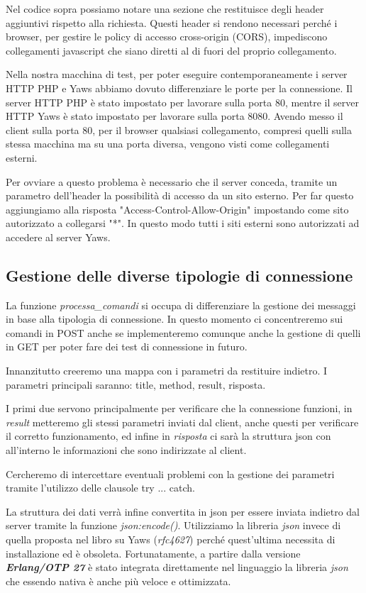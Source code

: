 Nel codice sopra possiamo notare una sezione che restituisce degli header aggiuntivi rispetto alla richiesta. Questi header si rendono necessari perch\'e i browser, per gestire le policy di accesso cross-origin (CORS), impediscono collegamenti javascript che siano diretti al di fuori del proprio collegamento.

Nella nostra macchina di test, per poter eseguire contemporaneamente i server HTTP PHP e Yaws abbiamo dovuto differenziare le porte per la connessione. Il server HTTP PHP \`e stato impostato per lavorare sulla porta 80, mentre il server HTTP Yaws \`e stato impostato per lavorare sulla porta 8080.
Avendo messo il client sulla porta 80, per il browser qualsiasi collegamento, compresi quelli sulla stessa macchina ma su una porta diversa, vengono visti come collegamenti esterni.

Per ovviare a questo problema \`e necessario che il server conceda, tramite un parametro dell'header la possibilit\`a di accesso da un sito esterno. Per far questo aggiungiamo alla risposta "Access-Control-Allow-Origin" impostando come sito autorizzato a collegarsi "*". In questo modo tutti i siti esterni sono autorizzati ad accedere al server Yaws.

\subsection{Gestione delle diverse tipologie di connessione}
La funzione \textit{processa\_comandi} si occupa di differenziare la gestione dei messaggi in base alla tipologia di connessione.
In questo momento ci concentreremo sui comandi in POST anche se implementeremo comunque anche la gestione di quelli in GET per poter fare dei test di connessione in futuro.

Innanzitutto creeremo una mappa con i parametri da restituire indietro. I parametri principali saranno: title, method, result, risposta. 

I primi due servono principalmente per verificare che la connessione funzioni, in \textit{result} metteremo gli stessi parametri inviati dal client, anche questi per verificare il corretto funzionamento, ed infine in \textit{risposta} ci sar\`a la struttura json con all'interno le informazioni che sono indirizzate al client.

Cercheremo di intercettare eventuali problemi con la gestione dei parametri tramite l'utilizzo delle clausole try ... catch.

La struttura dei dati verr\`a infine convertita in json per essere inviata indietro dal server tramite la funzione \textit{json:encode()}. Utilizziamo la libreria \textit{json} invece di quella proposta nel libro  su Yaws \cite{art:building_web_erlang} (\textit{rfc4627}) perch\'e quest'ultima necessita di installazione ed \`e obsoleta. Fortunatamente, a partire dalla versione \textit{\textbf{Erlang/OTP 27}} \`e stato integrata direttamente nel linguaggio la libreria \textit{json} che essendo nativa \`e anche pi\`u veloce e ottimizzata.

